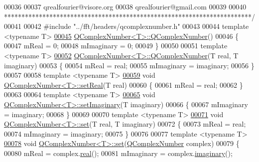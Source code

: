 \begin{DoxyCode}
00036 \textcolor{comment}{}
00037 \textcolor{comment}{qrealfourier@visore.org}
00038 \textcolor{comment}{qrealfourier@gmail.com}
00039 \textcolor{comment}{}
00040 \textcolor{comment}{***********************************************************************/}
00041 
00042 \textcolor{preprocessor}{#include "../fft/headers/qcomplexnumber.h"}
00043 
00044 \textcolor{keyword}{template} <\textcolor{keyword}{typename} T>
\hypertarget{a00113_source_l00045}{}\hyperlink{a00021_ab6cfaeb5d656fc31d881859071a5573d}{00045} \hyperlink{a00021_ab6cfaeb5d656fc31d881859071a5573d}{QComplexNumber<T>::QComplexNumber}()
00046 \{
00047     mReal = 0;
00048     mImaginary = 0;
00049 \}
00050 
00051 \textcolor{keyword}{template} <\textcolor{keyword}{typename} T>
\hypertarget{a00113_source_l00052}{}\hyperlink{a00021_a9fce5b1d7905b96634343eec4c9e8ed7}{00052} \hyperlink{a00021_ab6cfaeb5d656fc31d881859071a5573d}{QComplexNumber<T>::QComplexNumber}(T real, T imaginary)
00053 \{
00054     mReal = real;
00055     mImaginary = imaginary;
00056 \}
00057 
00058 \textcolor{keyword}{template} <\textcolor{keyword}{typename} T>
\hypertarget{a00113_source_l00059}{}\hyperlink{a00021_a14cf134bd211f979baf2f559ae7114f9}{00059} \textcolor{keywordtype}{void} \hyperlink{a00021_a14cf134bd211f979baf2f559ae7114f9}{QComplexNumber<T>::setReal}(T real)
00060 \{
00061     mReal = real;
00062 \}
00063 
00064 \textcolor{keyword}{template} <\textcolor{keyword}{typename} T>
\hypertarget{a00113_source_l00065}{}\hyperlink{a00021_a806177c406d4fbab30385105c70c4655}{00065} \textcolor{keywordtype}{void} \hyperlink{a00021_a806177c406d4fbab30385105c70c4655}{QComplexNumber<T>::setImaginary}(T imaginary)
00066 \{
00067     mImaginary = imaginary;
00068 \}
00069 
00070 \textcolor{keyword}{template} <\textcolor{keyword}{typename} T>
\hypertarget{a00113_source_l00071}{}\hyperlink{a00021_ab038e64285fc23aeae05e987ec9ed9d8}{00071} \textcolor{keywordtype}{void} \hyperlink{a00021_ab038e64285fc23aeae05e987ec9ed9d8}{QComplexNumber<T>::set}(T real, T imaginary)
00072 \{
00073     mReal = real;
00074     mImaginary = imaginary;
00075 \}
00076 
00077 \textcolor{keyword}{template} <\textcolor{keyword}{typename} T>
\hypertarget{a00113_source_l00078}{}\hyperlink{a00021_a1c6b4228b0849c2a4509056904a134c6}{00078} \textcolor{keywordtype}{void} \hyperlink{a00021_ab038e64285fc23aeae05e987ec9ed9d8}{QComplexNumber<T>::set}(\hyperlink{a00021}{QComplexNumber} complex)
00079 \{
00080     mReal = complex.\hyperlink{a00021_a01ca02979072629fdf76770971bff461}{real}();
00081     mImaginary = complex.\hyperlink{a00021_a9fa649f50f64f9e8d26da107c6f779bb}{imaginary}();

\end{DoxyCode}

